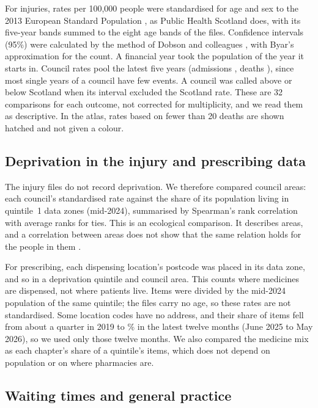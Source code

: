 \documentclass[11pt,a4paper]{article}
\begin{document}
For injuries, rates per 100{,}000 people were standardised for age and sex to the 2013 European
Standard Population \citep{esp2013}, as Public Health Scotland does, with its five-year bands summed
to the eight age bands of the files. Confidence intervals (95\%) were calculated by the method of
Dobson and colleagues \citep{dobson1991}, with Byar's approximation for the count. A financial year
took the population of the year it starts in. Council rates pool the latest five years (admissions
\fallsPeriod{}, deaths \councilPeriod{}), since most single years of a council have few events. A
council was called above or below Scotland when its interval excluded the Scotland rate. These are
32 comparisons for each outcome, not corrected for multiplicity, and we read them as descriptive. In
the atlas, rates based on fewer than 20 deaths are shown hatched and not given a colour.

\subsection{Deprivation in the injury and prescribing data}

The injury files do not record deprivation. We therefore compared council areas: each council's
standardised rate against the share of its population living in quintile~1 data zones (mid-2024),
summarised by Spearman's rank correlation with average ranks for ties. This is an ecological
comparison. It describes areas, and a correlation between areas does not show that the same
relation holds for the people in them \citep{robinson1950}.

For prescribing, each dispensing location's postcode was placed in its data zone, and so in a
deprivation quintile and council area. This counts where medicines are dispensed, not where patients
live. Items were divided by the mid-2024 population of the same quintile; the files carry no age, so
these rates are not standardised. Some location codes have no address, and their share of items fell
from about a quarter in 2019 to \unplacedShare\% in the latest twelve months (June 2025 to May
2026), so we used only those twelve months. We also compared the medicine mix as each chapter's
share of a quintile's items, which does not depend on population or on where pharmacies are.

\subsection{Waiting times and general practice}
\end{document}

